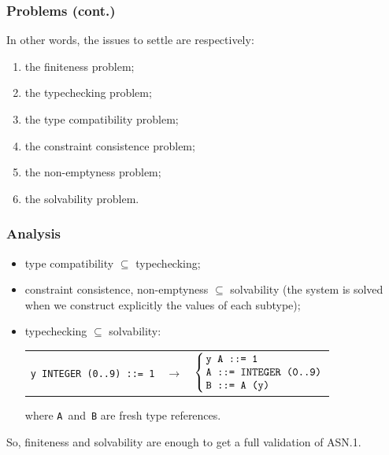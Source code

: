 \documentclass[compress,dvips,xcolor={dvipsnames},t]{beamer}
\newcommand\ASN{\textsf{ASN.1}\xspace}
\begin{document}
\begin{frame}
\frametitle{Problems (cont.)}

In other words, the issues to settle are respectively:
\begin{enumerate}

  \item the finiteness problem;

  \item the typechecking problem;

  \item the type compatibility problem;

  \item the constraint consistence problem;

  \item the non-emptyness problem;

  \item the solvability problem.

\end{enumerate}

\end{frame}

\begin{frame}
\frametitle{Analysis}

\begin{itemize}

  \item type compatibility $\subseteq$ typechecking;

  \item constraint consistence, non-emptyness $\subseteq$ solvability
        (the system is solved when we construct explicitly the values
        of each subtype);

  \item typechecking $\subseteq$ solvability:
\begin{tabular}{@{}r@{\,}c@{\,}l@{}}
   \texttt{y INTEGER (0..9) ::= 1}
   & $\rightarrow$
   & $\left\{
       \begin{tabular}{@{\,}l@{}}
           \texttt{y A ::= 1} \\
           \texttt{A ::= INTEGER (0..9)} \\
           \texttt{B ::= A (y)}
        \end{tabular}
     \right.$
\end{tabular}
where \texttt{A}~and~\texttt{B} are fresh type references.

\end{itemize}

So, finiteness and solvability are enough to get a full validation of
\ASN.

\end{frame}
\end{document}
